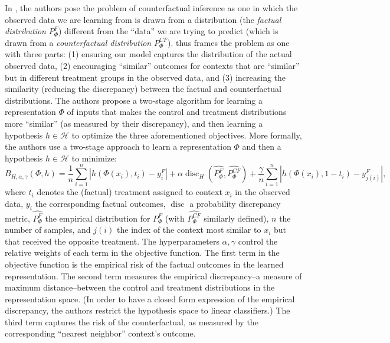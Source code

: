 \documentclass{article}
\begin{document}
In \cite{johansson2016learning}, the authors pose the problem of counterfactual inference as one in which the observed data we are learning from is drawn from a distribution (the \emph{factual distribution} $P_{\Phi}^F$) different from the ``data'' we are trying to predict (which is drawn from a \emph{counterfactual distribution} $P_{\Phi}^{CF}$). \cite{johansson2016learning} thus frames the problem as one with three parts: (1) ensuring our model captures the distribution of the actual observed data, (2) encouraging ``similar'' outcomes for contexts that are ``similar'' but in different treatment groups in the observed data, and (3)  increasing the similarity (reducing the discrepancy) between the factual and counterfactual distributions.
The authors propose a two-stage algorithm for learning a representation $\Phi$ of inputs that makes the control and treatment distributions more ``similar'' (as measured by their discrepancy), and then learning a hypothesis $h \in \mathcal{H}$ to optimize the three aforementioned objectives.
More formally, the authors use a two-stage approach to learn a representation $\Phi$ and then a hypothesis $h \in \mathcal{H}$ to minimize:
\begin{equation}
    B_{H, \alpha, \gamma}(\Phi, h) = \frac{1}{n}\sum_{i = 1}^n \left|h(\Phi(x_i), t_i)-y_i^F\right|+ \alpha \operatorname{disc}_H(\hat{P_{\Phi}^F}, \hat{P_{\Phi}^{CF}}) + \frac{\gamma}{n}\sum_{i=1}^n \left|h(\Phi(x_i), 1-t_i) - y_{j(i)}^F \right|,
\end{equation}
where $t_i$ denotes the (factual) treatment assigned to context $x_i$ in the observed data, $y_i$ the corresponding factual outcomes, $\operatorname{disc}$ a probability discrepancy metric, $\hat{P_{\Phi}^F}$ the empirical distribution for $P_{\Phi}^F$ (with $\hat{P_{\Phi}^{CF}}$ similarly defined), $n$ the number of samples, and $j(i)$ the index of the context most similar to $x_i$ but that received the opposite treatment.
The hyperparameters $\mathcal{\alpha, \gamma}$ control the relative weights of each term in the objective function.
The first term in the objective function is the empirical risk of the factual outcomes in the learned representation. The second term measures the empirical discrepancy--a measure of maximum distance--between the control and treatment distributions in the representation space. (In order to have a closed form expression of the empirical discrepancy, the authors restrict the hypothesis space to linear classifiers.)
The third term captures the risk of the counterfactual, as measured by the corresponding ``nearest neighbor'' context's outcome. 
\end{document}
